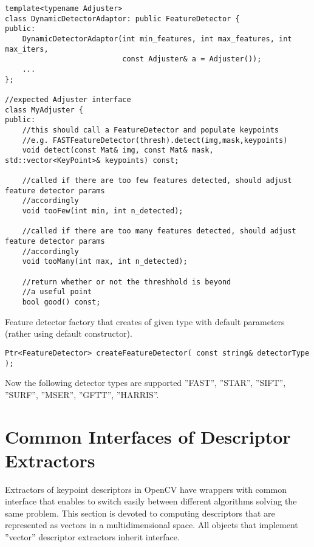 \begin{lstlisting}
template<typename Adjuster>
class DynamicDetectorAdaptor: public FeatureDetector {
public:
	DynamicDetectorAdaptor(int min_features, int max_features, int max_iters, 
						   const Adjuster& a = Adjuster());
    ...
};

//expected Adjuster interface
class MyAdjuster {
public:
	//this should call a FeatureDetector and populate keypoints
	//e.g. FASTFeatureDetector(thresh).detect(img,mask,keypoints)
	void detect(const Mat& img, const Mat& mask, std::vector<KeyPoint>& keypoints) const;

	//called if there are too few features detected, should adjust feature detector params
	//accordingly
	void tooFew(int min, int n_detected);
	
	//called if there are too many features detected, should adjust feature detector params
	//accordingly
	void tooMany(int max, int n_detected);

	//return whether or not the threshhold is beyond
	//a useful point
	bool good() const;
\end{lstlisting}


Feature detector factory that creates  of given type with 
default parameters (rather using default constructor).

\begin{lstlisting}
Ptr<FeatureDetector> createFeatureDetector( const string& detectorType );
\end{lstlisting}

\begin{description}
\end{description}

Now the following detector types are supported ''FAST'', ''STAR'', ''SIFT'', 
''SURF'', ''MSER'', ''GFTT'', ''HARRIS''.

\section{Common Interfaces of Descriptor Extractors}
Extractors of keypoint descriptors in OpenCV have wrappers with common interface that enables to switch easily 
between different algorithms solving the same problem. This section is devoted to computing descriptors 
that are represented as vectors in a multidimensional space. All objects that implement ''vector'' 
descriptor extractors inherit  interface.

